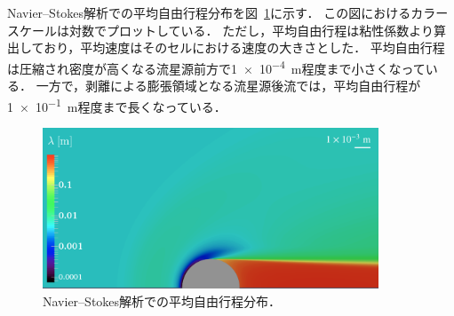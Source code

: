 Navier–Stokes解析での平均自由行程分布を図~\ref{fig:ns-lambda}に示す．
この図におけるカラースケールは対数でプロットしている．
ただし，平均自由行程は粘性係数より算出しており，平均速度はそのセルにおける速度の大きさとした．
平均自由行程は圧縮され密度が高くなる流星源前方で\SI{1e-4}{m}程度まで小さくなっている．
一方で，剥離による膨張領域となる流星源後流では，平均自由行程が\SI{1e-1}{m}程度まで長くなっている．
\begin{figure}[H]
    \centering
    \includegraphics[width=10cm]{fig/min_knud/ns/mean_free_path.png}
    \caption{Navier–Stokes解析での平均自由行程分布．}
    \label{fig:ns-lambda}
\end{figure}

